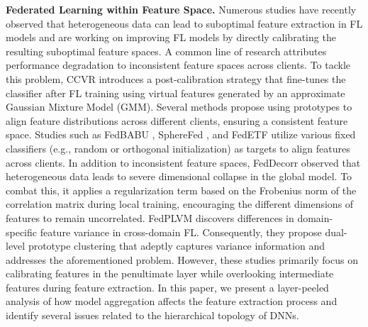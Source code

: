 \textbf{Federated Learning within Feature Space.} 
Numerous studies have recently observed that heterogeneous data can lead to suboptimal feature extraction in FL models and are working on improving FL models by directly calibrating the resulting suboptimal feature spaces. 
A common line of research attributes performance degradation to inconsistent feature spaces across clients. 
To tackle this problem, CCVR \cite{CCVR} introduces a post-calibration strategy that fine-tunes the classifier after FL training using virtual features generated by an approximate Gaussian Mixture Model (GMM).
Several methods \cite{FedProto, AlignFed, AlignFed1, FedFA, FPL} propose using prototypes to align feature distributions across different clients, ensuring a consistent feature space. Studies such as FedBABU \cite{FedBABU}, SphereFed \cite{SphereFed}, and FedETF \cite{FedETF} utilize various fixed classifiers (e.g., random or orthogonal initialization) as targets to align features across clients.
In addition to inconsistent feature spaces, FedDecorr \cite{FedDecorr_ICLR,FedDecorr_TPAMI} observed that heterogeneous data leads to severe dimensional collapse in the global model. 
To combat this, it applies a regularization term based on the Frobenius norm of the correlation matrix during local training, encouraging the different dimensions of features to remain uncorrelated. 
FedPLVM \cite{FedPLVM} discovers differences in domain-specific feature variance in cross-domain FL. 
Consequently, they propose dual-level prototype clustering that adeptly captures variance information and addresses the aforementioned problem.
However, these studies primarily focus on calibrating features in the penultimate layer while overlooking intermediate features during feature extraction.
In this paper, we present a layer-peeled analysis of how model aggregation affects the feature extraction process and identify several issues related to the hierarchical topology of DNNs.

